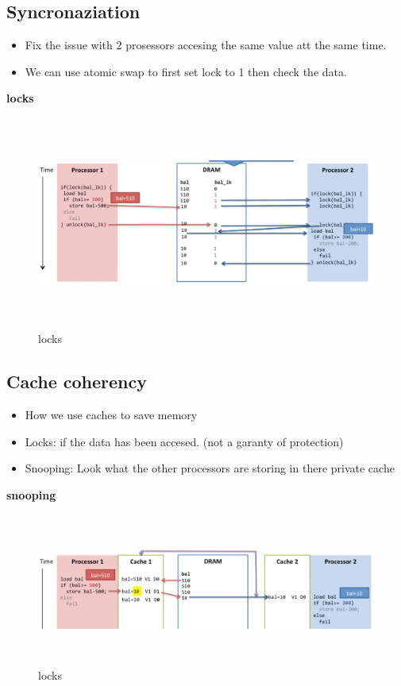 \subsection{Syncronaziation}
\begin{itemize}
\item  Fix the issue with 2 prosessors accesing the same value att the same time.
\item  We can use atomic swap to first set lock to 1 then check the data.
\end{itemize}

\newpage

\textbf{locks}
\begin{figure}[h]
    \vspace{10mm}
    \centering
    \includegraphics[width=16cm, height=7cm]{image/locks.png}
    \caption{locks}
\end{figure}


\subsection{Cache coherency}
\begin{itemize}
\item  How we use caches to save memory
\item  Locks: if the data has been accesed. (not a garanty of protection)
\item  Snooping: Look what the other processors are storing in there private cache   
\end{itemize}
  

\textbf{snooping}
\begin{figure}[h]
    \vspace{10mm}
    \centering
    \includegraphics[width=16cm, height=5cm]{image/snooping.png}
    \caption{locks}
\end{figure}

